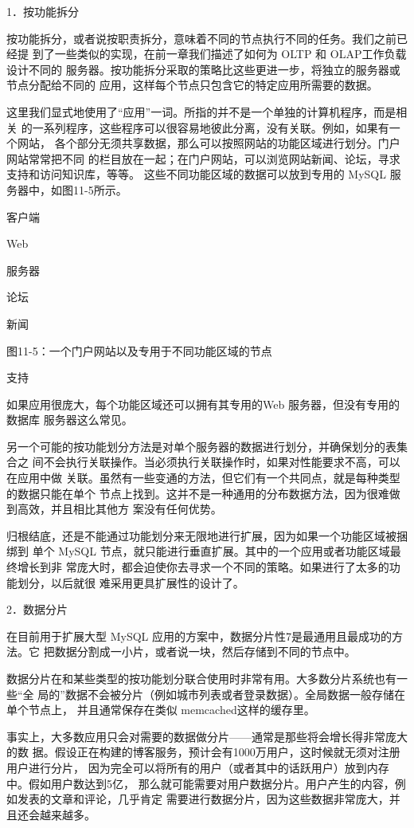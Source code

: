 1．按功能拆分

按功能拆分，或者说按职责拆分，意味着不同的节点执行不同的任务。我们之前已经提
到了一些类似的实现，在前一章我们描述了如何为 OLTP 和 OLAP工作负载设计不同的
服务器。按功能拆分采取的策略比这些更进一步，将独立的服务器或节点分配给不同的
应用，这样每个节点只包含它的特定应用所需要的数据。

这里我们显式地使用了“应用”一词。所指的并不是一个单独的计算机程序，而是相关
的一系列程序，这些程序可以很容易地彼此分离，没有关联。例如，如果有一个网站，
各个部分无须共享数据，那么可以按照网站的功能区域进行划分。门户网站常常把不同
的栏目放在一起；在门户网站，可以浏览网站新闻、论坛，寻求支持和访问知识库，等等。
这些不同功能区域的数据可以放到专用的 MySQL 服务器中，如图11-5所示。

客户端

Web

服务器

论坛

新闻

图11-5：一个门户网站以及专用于不同功能区域的节点

支持

如果应用很庞大，每个功能区域还可以拥有其专用的Web 服务器，但没有专用的数据库
服务器这么常见。

另一个可能的按功能划分方法是对单个服务器的数据进行划分，并确保划分的表集合之
间不会执行关联操作。当必须执行关联操作时，如果对性能要求不高，可以在应用中做
关联。虽然有一些变通的方法，但它们有一个共同点，就是每种类型的数据只能在单个
节点上找到。这并不是一种通用的分布数据方法，因为很难做到高效，并且相比其他方
案没有任何优势。

归根结底，还是不能通过功能划分来无限地进行扩展，因为如果一个功能区域被捆绑到
单个 MySQL 节点，就只能进行垂直扩展。其中的一个应用或者功能区域最终增长到非
常庞大时，都会迫使你去寻求一个不同的策略。如果进行了太多的功能划分，以后就很
难采用更具扩展性的设计了。

2．数据分片

在目前用于扩展大型 MySQL 应用的方案中，数据分片性7是最通用且最成功的方法。它
把数据分割成一小片，或者说一块，然后存储到不同的节点中。

数据分片在和某些类型的按功能划分联合使用时非常有用。大多数分片系统也有一些“全
局的”数据不会被分片（例如城市列表或者登录数据）。全局数据一般存储在单个节点上，
并且通常保存在类似 memcached这样的缓存里。

事实上，大多数应用只会对需要的数据做分片——通常是那些将会增长得非常庞大的数
据。假设正在构建的博客服务，预计会有1000万用户，这时候就无须对注册用户进行分片，
因为完全可以将所有的用户（或者其中的话跃用户）放到内存中。假如用户数达到5亿，
那么就可能需要对用户数据分片。用户产生的内容，例如发表的文章和评论，几乎肯定
需要进行数据分片，因为这些数据非常庞大，并且还会越来越多。

